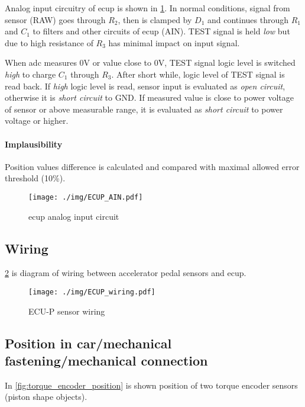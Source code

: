 Analog input circuitry of \gls{ecup} is shown in \ref{fig:ecup_analog_input}. In normal conditions, signal from sensor (RAW) goes through $R_2$, then is clamped by $D_1$ and continues through $R_1$ and $C_1$ to filters and other circuits of \gls{ecup} (AIN). TEST signal is held \textit{low} but due to high resistance of $R_3$ has minimal impact on input signal.

When \gls{adc} measures 0V or value close to 0V, TEST signal logic level is switched \textit{high} to charge $C_1$ through $R_3$. After short while, logic level of TEST signal is read back. If \textit{high} logic level is read, sensor input is evaluated as \textit{open circuit}, otherwise it is \textit{short circuit} to GND. If measured value is close to power voltage of sensor or above measurable range, it is evaluated as \textit{short circuit} to power voltage or higher.

\paragraph{Implausibility}
Position values difference is calculated and compared with maximal allowed error threshold (10\%).

\begin{figure}[H]
\begin{center}
	\texttt{[image: ./img/ECUP\_AIN.pdf]}
	\caption{\gls{ecup} analog input circuit}
	\label{fig:ecup_analog_input}
\end{center}
\end{figure}



\subsection{Wiring}
\ref{fig:ecup_wiring} is diagram of wiring between accelerator pedal sensors and \gls{ecup}.

\begin{figure}[H]
\begin{center}
	\texttt{[image: ./img/ECUP\_wiring.pdf]}
	\caption{ECU-P sensor wiring}
	\label{fig:ecup_wiring}
\end{center}
\end{figure}

\subsection{Position in car/mechanical fastening/mechanical connection}
In \ref{fig:torque_encoder_position} is shown position of two torque encoder sensors (piston shape objects).

